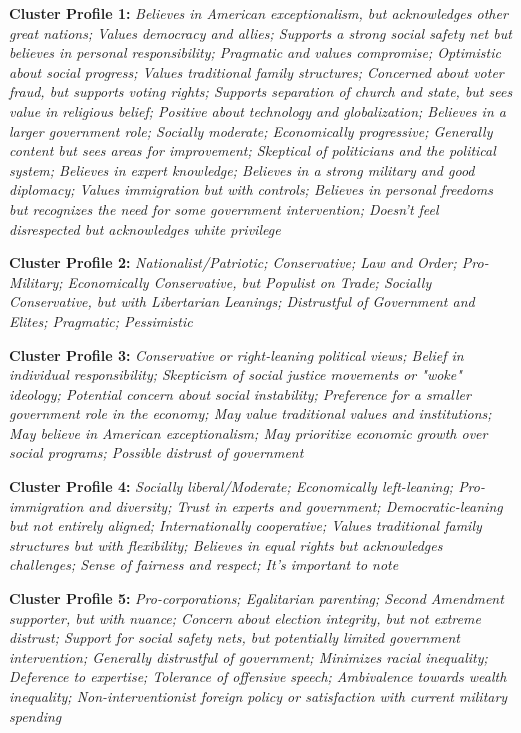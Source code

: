 \documentclass[11pt]{article}
\newcommand{\profiletext}[1]{\textit{#1}}
\begin{document}
\textbf{Cluster Profile 1:} \profiletext{Believes in American exceptionalism, but acknowledges other great nations; Values democracy and allies; Supports a strong social safety net but believes in personal responsibility; Pragmatic and values compromise; Optimistic about social progress; Values traditional family structures; Concerned about voter fraud, but supports voting rights; Supports separation of church and state, but sees value in religious belief; Positive about technology and globalization; Believes in a larger government role; Socially moderate; Economically progressive; Generally content but sees areas for improvement; Skeptical of politicians and the political system; Believes in expert knowledge; Believes in a strong military and good diplomacy; Values immigration but with controls; Believes in personal freedoms but recognizes the need for some government intervention; Doesn't feel disrespected but acknowledges white privilege}

\textbf{Cluster Profile 2:} \profiletext{Nationalist/Patriotic; Conservative; Law and Order; Pro-Military; Economically Conservative, but Populist on Trade; Socially Conservative, but with Libertarian Leanings; Distrustful of Government and Elites; Pragmatic; Pessimistic}

\textbf{Cluster Profile 3:} \profiletext{Conservative or right-leaning political views; Belief in individual responsibility; Skepticism of social justice movements or "woke" ideology; Potential concern about social instability; Preference for a smaller government role in the economy; May value traditional values and institutions; May believe in American exceptionalism; May prioritize economic growth over social programs; Possible distrust of government}

\textbf{Cluster Profile 4:} \profiletext{Socially liberal/Moderate; Economically left-leaning; Pro-immigration and diversity; Trust in experts and government; Democratic-leaning but not entirely aligned; Internationally cooperative; Values traditional family structures but with flexibility; Believes in equal rights but acknowledges challenges; Sense of fairness and respect; It's important to note}

\textbf{Cluster Profile 5:} \profiletext{Pro-corporations; Egalitarian parenting; Second Amendment supporter, but with nuance; Concern about election integrity, but not extreme distrust; Support for social safety nets, but potentially limited government intervention; Generally distrustful of government; Minimizes racial inequality; Deference to expertise; Tolerance of offensive speech; Ambivalence towards wealth inequality; Non-interventionist foreign policy or satisfaction with current military spending}
\end{document}
